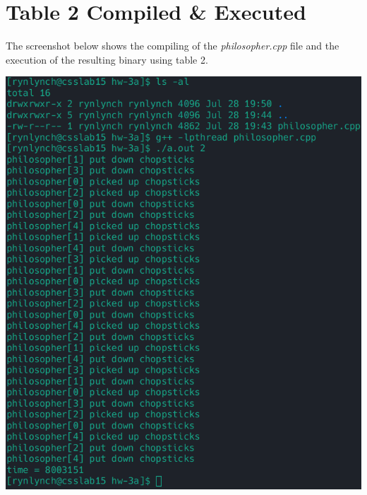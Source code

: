 \documentclass[a4paper,11pt,twoside]{article}
\begin{document}
\section*{Table 2 Compiled \& Executed}
\label{sec:org3d91908}
The screenshot below shows the compiling of the \emph{philosopher.cpp} file and the execution of the resulting binary using table 2.
\begin{center}
\includegraphics[width=.9\linewidth]{./images/table2.png}
\end{center}
\end{document}
